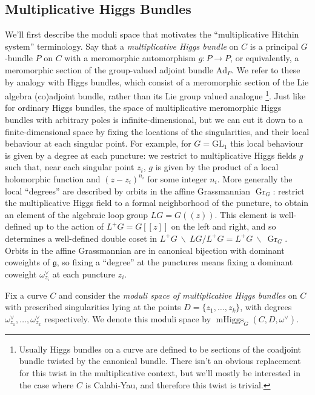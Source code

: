 \documentclass[11pt, oneside, reqno]{amsart}
\theoremstyle{definition} \newtheorem{definition}{Definition}[section]
\theoremstyle{definition} \newtheorem{remark}[definition]{Remark}
\theoremstyle{definition} \newtheorem{remarks}[definition]{Remarks}
\theoremstyle{definition} \newtheorem{question}[definition]{Question}
\theoremstyle{definition} \newtheorem*{note}{Note}
\theoremstyle{definition} \newtheorem{example}[definition]{Example}
\theoremstyle{definition} \newtheorem{examples}[definition]{Examples}
\renewcommand{\gg}{\mathfrak{g}}
\newcommand{\mr}[1]{\mathrm{#1}}
\newcommand{\bs}{\ \backslash \ }
\newcommand{\GL}{\mathrm{GL}}
\DeclareMathOperator{\Gr}{Gr}
\DeclareMathOperator{\mhiggs}{mHiggs}
\begin{document}
\subsection{Multiplicative Higgs Bundles}
We'll first describe the moduli space that motivates the ``multiplicative Hitchin system'' terminology.  Say that a \emph{multiplicative Higgs bundle} on $C$ is a principal $G$-bundle $P$ on $C$ with a meromorphic automorphism $g \colon P \to P$, or
equivalently, a meromorphic section of the group-valued adjoint bundle $\mr{Ad}_P$.  We refer to these by analogy with Higgs bundles, which consist of a meromorphic section of the Lie algebra (co)adjoint
bundle, rather than its Lie group valued analogue \footnote{Usually
  Higgs bundles on a curve are defined to be sections of the coadjoint
  bundle twisted by the canonical bundle.  There isn't an obvious
  replacement for this twist in the multiplicative context, but we'll
  mostly be interested in the case where $C$ is Calabi-Yau, and
  therefore this twist is trivial.}.  Just like for ordinary Higgs
bundles, the space of multiplicative meromorphic Higgs bundles with
arbitrary poles is infinite-dimensional, but we can cut it down to a
finite-dimensional space by fixing the locations of the singularities,
and their local behaviour at each singular point.  For example, for $G = \GL_1$ this local behaviour is given by a degree at each puncture: we restrict to multiplicative Higgs fields $g$ such that, near each singular point $z_i$, $g$ is given by the product of a local holomorphic function and $(z-z_i)^{n_i}$ for some integer $n_i$.  More generally the local ``degrees'' are described by orbits in the
affine Grassmannian $\Gr_G$: restrict the multiplicative Higgs field
to a formal neighborhood of the puncture, to obtain an element of the
algebraic loop group $LG = G(\!(z)\!)$.  This element is well-defined
up to the action of $L^+G = G[[z]]$ on the left and right, and so
determines a well-defined double coset in
$L^+G \!\!\bs\!\! LG/L^+G = L^+G \!\!\bs\!\! \Gr_G$.  Orbits in the
affine Grassmannian are in canonical bijection with dominant coweights
of $\gg$, so fixing a ``degree'' at the punctures means fixing a dominant
coweight $\omega^\vee_{z_i}$ at each puncture $z_i$.
 
 Fix a curve $C$ and consider the \emph{moduli space of multiplicative Higgs bundles} on $C$ with prescribed singularities lying at the points $D = \{z_1, \ldots, z_k\}$, with degrees $\omega_{z_1}^\vee, \ldots, \omega_{z_k}^\vee$ respectively.  We denote this moduli space by $\mhiggs_G(C,D,\omega^\vee)$.
 
\end{document}
